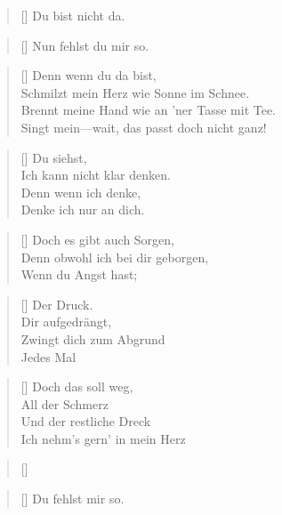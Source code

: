\documentclass[twocolumn]{article}
\title{
	\vspace{-5cm}
	\begin{flushleft}
		\titlevar \quad \raisebox{0.15em}{\normalsize(\authorvar)}
	\end{flushleft}
	}
\date{
	\vspace{-1.2cm}
	\begin{flushleft}
		\datevar
	\end{flushleft} 
	}
\newenvironment{Strophe}{\begin{minipage}{\versewidth} \begin{verse}[\versewidth]}{\end{verse} \end{minipage}\vspace{0.5em}}
\begin{document}
	\maketitle
	\thispagestyle{empty}
	
	\begin{Strophe}
		Du bist nicht da.
	\end{Strophe}
	
	\begin{Strophe}
		Nun fehlst du mir so.
	\end{Strophe}
	
	\begin{Strophe}
		Denn wenn du da bist, \\
		Schmilzt mein Herz wie Sonne im Schnee. \\
		Brennt meine Hand wie an 'ner Tasse mit Tee. \\
		Singt mein—wait, das passt doch nicht ganz! \\
	\end{Strophe}
	
	\begin{Strophe}
		Du siehst, \\
		Ich kann nicht klar denken. \\
		Denn wenn ich denke, \\
		Denke ich nur an dich. \\
	\end{Strophe}
	
	\begin{Strophe}
		Doch es gibt auch Sorgen, \\
		Denn obwohl ich bei dir geborgen, \\
		Wenn du Angst hast; \\
	\end{Strophe}
	
	\begin{Strophe}
		Der Druck. \\
		Dir aufgedrängt, \\
		Zwingt dich zum Abgrund \\
		Jedes Mal \\
	\end{Strophe}
	
	\begin{Strophe}
		Doch das soll weg, \\
		All der Schmerz \\
		Und der restliche Dreck \\
		Ich nehm's gern' in mein Herz  \\
	\end{Strophe}
	
	\begin{Strophe}
		
	\end{Strophe}
	
	\begin{Strophe}
		Du fehlst mir so.
	\end{Strophe}
\end{document}
